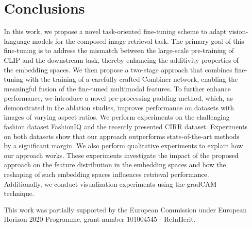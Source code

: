 \documentclass[acmlarge]{acmart}
\begin{document}
\section{Conclusions}\label{sec:conclusion}
In this work, we propose a novel task-oriented fine-tuning scheme to adapt vision-language models for the composed image retrieval task. The primary goal of this fine-tuning is to address the mismatch between the large-scale pre-training of CLIP and the downstream task, thereby enhancing the additivity properties of the embedding spaces.
We then propose a two-stage approach that combines fine-tuning with the training of a carefully crafted Combiner network, enabling the meaningful fusion of the fine-tuned multimodal features. To further enhance performance, we introduce a novel pre-processing padding method, which, as demonstrated in the ablation studies, improves performance on datasets with images of varying aspect ratios. We perform experiments on the challenging fashion dataset FashionIQ and the recently presented CIRR dataset. Experiments on both datasets show that our approach outperforms state-of-the-art methods by a significant margin.
We also perform qualitative experiments to explain how our approach works. These experiments investigate the impact of the proposed approach on the feature distribution in the embedding spaces and how the reshaping of such embedding spaces influences retrieval performance. Additionally, we conduct visualization experiments using the gradCAM technique.




\begin{acks}
This work was partially supported by the European Commission under European Horizon 2020 Programme, grant number 101004545 - ReInHerit.
\end{acks}




\end{document}
